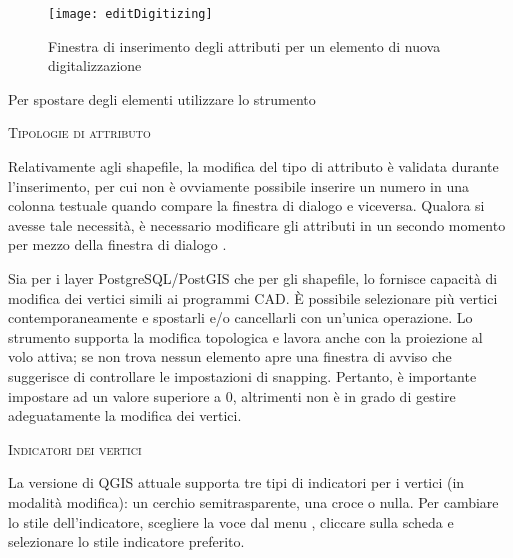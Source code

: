 \begin{figure}[ht]
   \centering
   \texttt{[image: editDigitizing]}
   \caption{Finestra di inserimento degli attributi per un elemento di nuova
   digitalizzazione \nixcaption}\label{fig:vector_digitising}
 \end{figure}

Per spostare degli elementi utilizzare lo strumento 

\begin{Tip}\caption{\textsc{Tipologie di attributo}}
Relativamente agli shapefile, la modifica del tipo di attributo è validata durante
l'inserimento, per cui non è ovviamente possibile inserire un numero in una colonna testuale 
quando compare la finestra di dialogo  e viceversa. Qualora si avesse tale necessità, 
è necessario modificare gli attributi in un secondo momento per mezzo della finestra di dialogo 
.
\end{Tip}


Sia per i layer PostgreSQL/PostGIS che per gli shapefile, lo  
fornisce capacità di modifica dei vertici simili ai programmi CAD. È possibile selezionare più vertici
contemporaneamente e spostarli e/o cancellarli con un'unica operazione. Lo strumento supporta la modifica 
topologica e lavora anche con la proiezione al volo attiva; se non trova nessun elemento apre una finestra 
di avviso che suggerisce di controllare le impostazioni di snapping. Pertanto, è importante impostare 
 \arrow {} \arrow {} 
\arrow {} ad un valore superiore a 0, 
altrimenti \qg non è in grado di gestire adeguatamente la modifica dei vertici.

\begin{Tip}\caption{\textsc{Indicatori dei vertici}}
La versione di QGIS attuale supporta tre tipi di indicatori per i vertici (in
modalità modifica): un cerchio semitrasparente, una croce o nulla. Per cambiare lo stile dell'indicatore,
scegliere la voce  dal menu , 
cliccare sulla scheda  e selezionare lo stile indicatore preferito.
\end{Tip}

